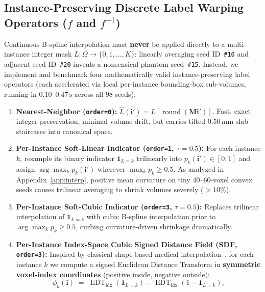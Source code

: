 \documentclass[10pt,a4paper]{article}
\renewcommand{\_}{\origunderscore\allowbreak}
\begin{document}
\subsection{Instance-Preserving Discrete Label Warping Operators ($f$ and $f^{-1}$)}
\label{sec:meth_labels}

Continuous B-spline interpolation must \textbf{never} be applied directly to a multi-instance integer mask $L : \Omega \to \{0, 1, \dots, K\}$: linearly averaging seed ID~\texttt{\#10} and adjacent seed ID~\texttt{\#20} invents a nonsensical phantom seed~\texttt{\#15}. Instead, we implement and benchmark four mathematically valid instance-preserving label operators (each accelerated via local per-instance bounding-box sub-volumes, running in $0.10\text{--}0.47\,\text{s}$ across all $98$ seeds):
\begin{enumerate}
    \item \textbf{Nearest-Neighbor (\texttt{order=0}):} $\hat{L}(\mathbf{i}') = L[\operatorname{round}(\mathbf{M}\mathbf{i}')]$. Fast, exact integer preservation, minimal volume drift, but carries tilted $0.50\,\text{mm}$ slab staircases into canonical space.
    \item \textbf{Per-Instance Soft-Linear Indicator (\texttt{order=1}, $\tau=0.5$):} For each instance $k$, resample its binary indicator $\mathbf{1}_{L=k}$ trilinearly into $p_k(\mathbf{i}') \in [0, 1]$ and assign $\arg\max_k p_k(\mathbf{i}')$ wherever $\max_k p_k \ge 0.5$. As analyzed in Appendix~\ref{app:interp}, positive mean curvature on tiny $40\text{--}60$-voxel convex seeds causes trilinear averaging to shrink volumes severely ($>10\%$).
    \item \textbf{Per-Instance Soft-Cubic Indicator (\texttt{order=3}, $\tau=0.5$):} Replaces trilinear interpolation of $\mathbf{1}_{L=k}$ with cubic B-spline interpolation prior to $\arg\max_k p_k \ge 0.5$, curbing curvature-driven shrinkage dramatically.
    \item \textbf{Per-Instance Index-Space Cubic Signed Distance Field (SDF, \texttt{order=3}):} Inspired by classical shape-based medical interpolation~\cite{raya1990shapebased}, for each instance $k$ we compute a signed Euclidean Distance Transform in \textbf{symmetric voxel-index coordinates} (positive inside, negative outside):
    \begin{equation}
        \phi_k(\mathbf{i}) \;=\; \operatorname{EDT}_{\text{idx}}(\mathbf{1}_{L=k}) - \operatorname{EDT}_{\text{idx}}(1 - \mathbf{1}_{L=k}),
        \label{eq:index_sdf}
    \end{equation}

\end{enumerate}
\end{document}
